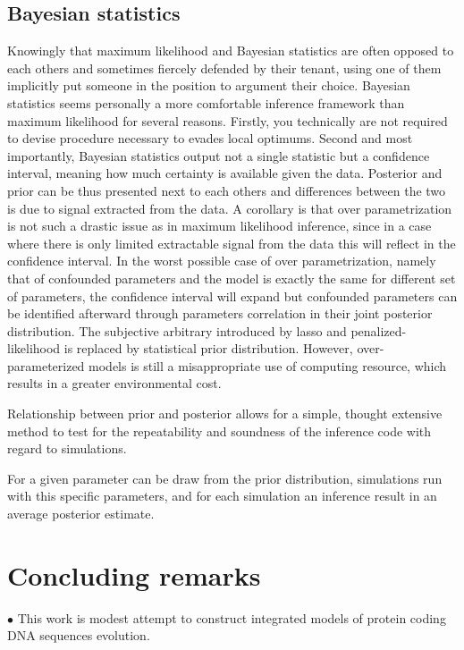 \subsection{Bayesian statistics}

Knowingly that maximum \gls{likelihood} and Bayesian statistics are often opposed to each others and sometimes fiercely defended by their tenant, using one of them implicitly put someone in the position to argument their choice. 
Bayesian statistics seems personally a more comfortable inference framework than maximum \gls{likelihood} for several reasons. 
Firstly, you technically are not required to devise procedure necessary to evades local optimums.
Second and most importantly, Bayesian statistics output not a single statistic but a confidence interval, meaning how much certainty is available given the data.
Posterior and \gls{prior} can be thus presented next to each others and differences between the two is due to signal extracted from the data.
A corollary is that over parametrization is not such a drastic issue as in maximum \gls{likelihood} inference, since in a case where there is only limited extractable signal from the data this will reflect in the confidence interval.
In the worst possible case of over parametrization, namely that of confounded parameters and the model is exactly the same for different set of parameters, the confidence interval will expand but confounded parameters can be identified afterward through parameters correlation in their joint \gls{posterior} distribution.
The subjective arbitrary introduced by lasso and penalized-likelihood is replaced by statistical \gls{prior} distribution.
However, over-parameterized models is still a misappropriate use of computing resource, which results in a greater environmental cost.

Relationship between \gls{prior} and \gls{posterior} allows for a simple, thought extensive method to test for the repeatability and soundness of the inference code with regard to simulations.

For a given parameter  can be draw from the \gls{prior} distribution, simulations run with this specific parameters, and for each simulation an inference result in an average \gls{posterior} estimate.

\section{Concluding remarks}

$\bullet$ This work is modest attempt to construct integrated models of protein coding DNA sequences evolution.

